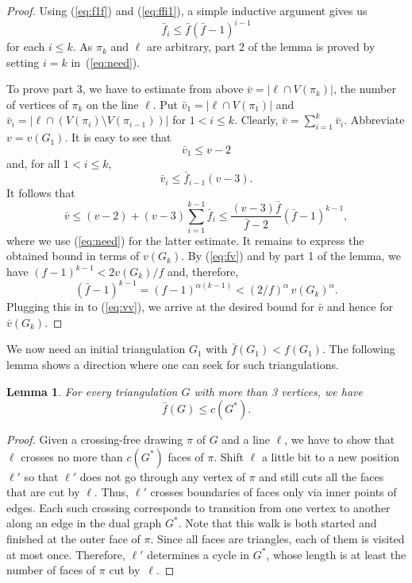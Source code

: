 \documentclass[reqno,12pt]{amsart}
\newcommand{\cut}[1]{\bar f(#1)}
\newcommand{\ff}{{\bar f}}
\newcommand{\vv}{{\bar v}}
\newcommand{\refeq}[1]{(\ref{eq:#1})}
\newtheorem{lemma}[theorem]{Lemma}
\begin{document}
\begin{proof}
Using \refeq{f1f} and \refeq{ffi1}, a simple inductive argument gives us
\begin{equation}\label{eq:need}
\ff_i\le\ff(\ff-1)^{i-1}
\end{equation}
for each $i\le k$. As $\pi_k$ and $\ell$ are arbitrary, part 2 of the lemma is proved
by setting $i=k$ in~\refeq{need}.

To prove part 3, we have to estimate from above $\vv=|\ell\cap V(\pi_k)|$,
the number of vertices of $\pi_k$ on the line $\ell$. Put $\vv_1=|\ell\cap V(\pi_1)|$
and $\vv_i=|\ell\cap (V(\pi_i)\setminus V(\pi_{i-1}))|$ for $1<i\le k$. Clearly,
$\vv=\sum_{i=1}^k\vv_i$. Abbreviate $v=v(G_1)$. It is easy to see that
$$
\vv_1\le v-2
$$
and, for all $1<i\le k$,
$$
\vv_i\le\ff_{i-1}(v-3).
$$
It follows that
\begin{equation}\label{eq:vv}
\vv\le(v-2)+(v-3)\sum_{i=1}^{k-1}\ff_i\le\frac{(v-3)\ff}{\ff-2}(\ff-1)^{k-1},
\end{equation}
where we use \refeq{need} for the latter estimate.
It remains to express the obtained bound in terms of $v(G_k)$.
By \refeq{fv} and by part 1 of the lemma, we have $(f-1)^{k-1}<2v(G_k)/f$ and, therefore,
$$
(\ff-1)^{k-1}=(f-1)^{\alpha(k-1)}<(2/f)^\alpha\, v(G_k)^\alpha.
$$
Plugging this in to \refeq{vv}, we arrive at the desired bound for $\vv$
and hence for $\vv(G_k)$.
\end{proof}

We now need an initial triangulation $G_1$ with $\cut{G_1}<f(G_1)$. The following lemma
shows a direction where one can seek for such triangulations.

\begin{lemma}\label{lem:duals}
For every triangulation $G$ with more than 3 vertices, we have
$$\cut G\le c(G^*).$$
\end{lemma}

\begin{proof}
Given a crossing-free drawing $\pi$ of $G$ and a line $\ell$, we have to show
that $\ell$ crosses no more than $c(G^*)$ faces of $\pi$.
Shift $\ell$ a little bit to a new position $\ell'$ so that
$\ell'$ does not go through any vertex of $\pi$ and still cuts all the faces
that are cut by $\ell$.
Thus, $\ell'$ crosses boundaries of faces only via inner points of edges.
Each such crossing corresponds to transition from one vertex to another
along an edge in the dual graph $G^*$. Note that this walk is both started
and finished at the outer face of $\pi$. Since all faces are triangles,
each of them is visited at most once. Therefore, $\ell'$ determines a cycle
in $G^*$, whose length is at least the number of faces of $\pi$ cut by~$\ell$.
\end{proof}
\end{document}
